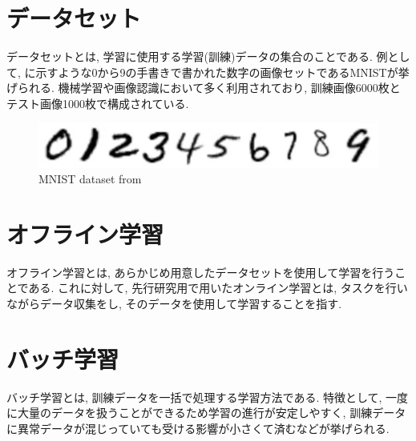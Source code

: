 \newpage
\section{データセット}
データセットとは, 学習に使用する学習(訓練)データの集合のことである. 例として, に示すような0から9の手書きで書かれた数字の画像セットであるMNISTが挙げられる. 機械学習や画像認識において多く利用されており, 訓練画像6000枚とテスト画像1000枚で構成されている. 

\vspace{5mm}

\begin{figure}[h]
     \centering
     \includegraphics[keepaspectratio, scale=0.5]
     {images/mnist.png}
     \caption{MNIST dataset from \cite{mnist}}
     \label{Fig:mnist}
     \end{figure}

\section{オフライン学習}
オフライン学習とは, あらかじめ用意したデータセットを使用して学習を行うことである. これに対して, 先行研究用で用いたオンライン学習とは, タスクを行いながらデータ収集をし, そのデータを使用して学習することを指す. 

\section{バッチ学習}
バッチ学習とは, 訓練データを一括で処理する学習方法である. 特徴として, 一度に大量のデータを扱うことができるため学習の進行が安定しやすく, 訓練データに異常データが混じっていても受ける影響が小さくて済むなどが挙げられる. 